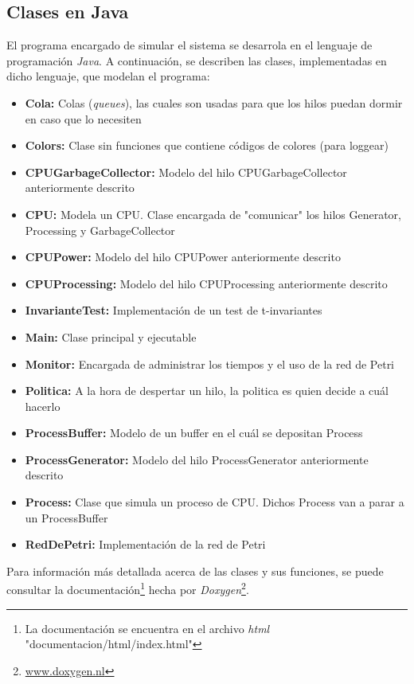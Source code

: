 \documentclass{article}
\newcommand{\fndoc}{La documentación se encuentra en el archivo \emph{html} "documentacion/html/index.html"}
\newcommand{\fndoxy}{\url{www.doxygen.nl}}
\begin{document}
    \subsection{Clases en Java}
    \begin{flushleft}
        El programa encargado de simular el sistema se desarrola en el lenguaje de programación
        \emph{Java}. A continuación, se describen las clases, implementadas en dicho lenguaje,
        que modelan el programa:
        \begin{itemize}
            \item \textbf{Cola:} Colas (\emph{queues}), las cuales son usadas para que los
            hilos puedan dormir en caso que lo necesiten
            \item \textbf{Colors:} Clase sin funciones que contiene códigos de colores (para 
            loggear)
            \item \textbf{CPUGarbageCollector:} Modelo del hilo CPUGarbageCollector anteriormente
            descrito
            \item \textbf{CPU:} Modela un CPU. Clase encargada de "comunicar" los hilos Generator,
            Processing y GarbageCollector
            \item \textbf{CPUPower:} Modelo del hilo CPUPower anteriormente descrito
            \item \textbf{CPUProcessing:} Modelo del hilo CPUProcessing anteriormente descrito
            \item \textbf{InvarianteTest:} Implementación de un test de t-invariantes
            \item \textbf{Main:} Clase principal y ejecutable
            \item \textbf{Monitor:} Encargada de administrar los tiempos y el uso de la red de 
            Petri
            \item \textbf{Politica:} A la hora de despertar un hilo, la politica es quien decide
            a cuál hacerlo
            \item \textbf{ProcessBuffer:} Modelo de un buffer en el cuál se depositan Process
            \item \textbf{ProcessGenerator:} Modelo del hilo ProcessGenerator anteriormente
            descrito
            \item \textbf{Process:} Clase que simula un proceso de CPU. Dichos Process van a
            parar a un ProcessBuffer
            \item \textbf{RedDePetri:} Implementación de la red de Petri
        \end{itemize}
        Para información más detallada acerca de las clases y sus funciones, se puede consultar
        la documentación\footnote{\fndoc} hecha por \emph{Doxygen}\footnote{\fndoxy}.
    \end{flushleft}
\end{document}
